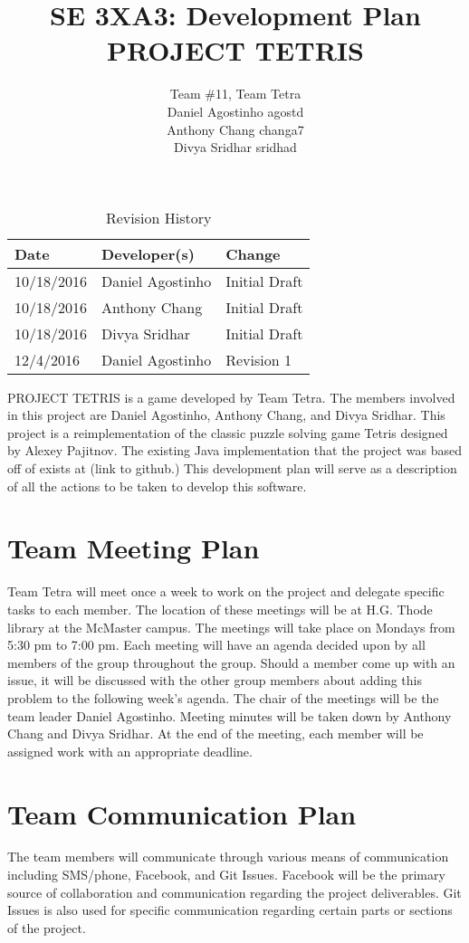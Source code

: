 \documentclass{article}
\title{SE 3XA3: Development Plan\\PROJECT TETRIS}
\author{ Team \#11, Team Tetra
		\\ Daniel Agostinho agostd
		\\ Anthony Chang changa7
		\\ Divya Sridhar sridhad
}
\date{}
\begin{document}
\begin{table}[hp]
\caption{Revision History} \label{TblRevisionHistory}
\begin{tabularx}{\textwidth}{llX}
\toprule
\textbf{Date} & \textbf{Developer(s)} & \textbf{Change}\\
\midrule
10/18/2016 & Daniel Agostinho & Initial Draft\\
10/18/2016 & Anthony Chang & Initial Draft\\
10/18/2016 & Divya Sridhar & Initial Draft\\
12/4/2016 & Daniel Agostinho & Revision 1\\
\bottomrule
\end{tabularx}
\end{table}

\newpage

\maketitle

PROJECT TETRIS is a game developed by Team Tetra. The members involved in this project are Daniel Agostinho, Anthony Chang, and Divya Sridhar.  This project is a reimplementation of the classic puzzle solving game Tetris designed by Alexey Pajitnov. The existing Java implementation that the project was based off of exists at (link to github.) This development plan will serve as a description of all the actions to be taken to develop this software.

\section{Team Meeting Plan}
Team Tetra will meet once a week to work on the project and delegate specific tasks to each member. The location of these meetings will be at H.G. Thode library at the McMaster campus. The meetings will take place on Mondays from 5:30 pm to 7:00 pm. Each meeting will have an agenda decided upon by all members of the group throughout the group. Should a member come up with an issue, it will be discussed with the other group members about adding this problem to the following week's agenda. The chair of the meetings will be the team leader Daniel Agostinho. Meeting minutes will be taken down by Anthony Chang and Divya Sridhar. At the end of the meeting, each member will be assigned work with an appropriate deadline.

\section{Team Communication Plan}
The team members will communicate through various means of communication including SMS/phone, Facebook, and Git Issues. Facebook will be the primary source of collaboration and communication regarding the project deliverables. Git Issues is also used for specific communication regarding certain parts or sections of the project.
\end{document}
